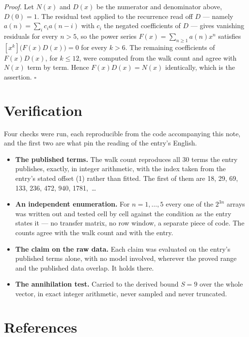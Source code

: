 \documentclass[11pt]{article}
\theoremstyle{definition}
\begin{document}
{\itshape Proof.} Let $N(x)$ and $D(x)$ be the numerator and denominator above, $D(0)=1$. The residual test applied to the recurrence read off $D$ --- namely $a(n) = \sum_i c_i a(n-i)$ with $c_i$ the negated coefficients of $D$ --- gives vanishing residuals for every $n > 5$, so the power series $F(x)=\sum_{n\ge 1}a(n)x^n$ satisfies $[x^k]\bigl(F(x)D(x)\bigr) = 0$ for every $k > 6$. The remaining coefficients of $F(x)D(x)$, for $k \le 12$, were computed from the walk count and agree with $N(x)$ term by term. Hence $F(x)D(x) = N(x)$ identically, which is the assertion. $\square$

\section{Verification}

Four checks were run, each reproducible from the code accompanying this note, and the first two are what pin the reading of the entry's English.

\begin{itemize}

\item {\bfseries The published terms.} The walk count reproduces all 30 terms the entry publishes, exactly, in integer arithmetic, with the index taken from the entry's stated offset (1) rather than fitted. The first of them are 18, 29, 69, 133, 236, 472, 940, 1781,~\dots

\item {\bfseries An independent enumeration.} For $n = 1,\dots,5$ every one of the $2^{3n}$ arrays was written out and tested cell by cell against the condition as the entry states it --- no transfer matrix, no row window, a separate piece of code. The counts agree with the walk count and with the entry.

\item {\bfseries The claim on the raw data.} Each claim was evaluated on the entry's published terms alone, with no model involved, wherever the proved range and the published data overlap. It holds there.

\item {\bfseries The annihilation test.} Carried to the derived bound $S = 9$ over the whole vector, in exact integer arithmetic, never sampled and never truncated.

\end{itemize}

\section{References}
\end{document}
